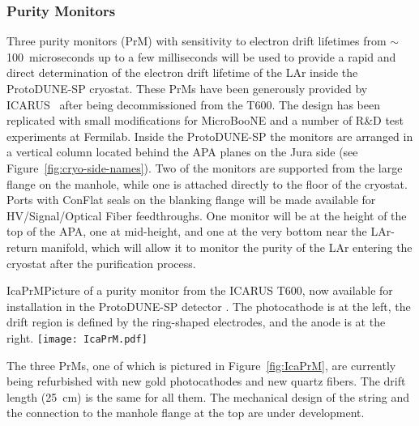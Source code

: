\subsubsection{Purity Monitors} 
Three purity monitors (PrM) with sensitivity
to electron drift lifetimes from $\sim$100~microseconds up to a few milliseconds
will be used to provide a rapid and direct determination of the 
electron drift lifetime
of the LAr inside the ProtoDUNE-SP cryostat. These PrMs have been generously provided by ICARUS~\cite{Amerio:2004ze} 
after being decommissioned from the T600. 
The design has been replicated with small modifications
for MicroBooNE and 
a number of  R\&D test experiments at Fermilab. Inside the ProtoDUNE-SP the monitors are arranged in a vertical 
column
located behind the APA planes on the Jura side (see Figure~\ref{fig:cryo-side-names}). 
Two of the monitors are supported from the large flange on the manhole, while one is attached directly to the floor of the cryostat.
Ports
 with ConFlat seals on the blanking flange will be made available for
 HV/Signal/Optical Fiber feedthroughs.
 One monitor will be at the height of the top of the APA,
 one at mid-height, and one at the very bottom near the LAr-return manifold, %
which will allow it to monitor
the purity of the LAr entering the cryostat after the purification process.  

\begin{cdrfigure}{IcaPrM}{Picture of a purity monitor from the ICARUS T600, now available for installation in the ProtoDUNE-SP detector
. The photocathode is at the left, the drift region is defined by the ring-shaped electrodes, and the anode is at the right.}
\texttt{[image: IcaPrM.pdf]} 
\end{cdrfigure}

The three PrMs, one of which is pictured in Figure~\ref{fig:IcaPrM}, are currently being refurbished with new gold photocathodes and new quartz fibers. The drift length  (25~cm) is the same for all them. 
The mechanical  design of the string and the connection to the manhole flange at the top 
are under development.

